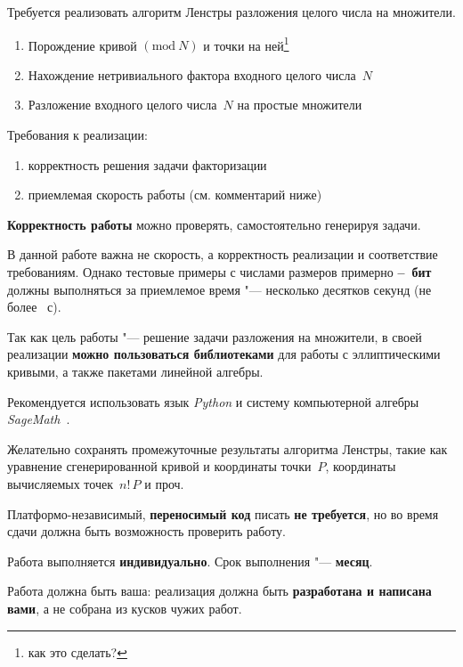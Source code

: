 \documentclass{ca-capstone}
\begin{document}


\goal
Требуется реализовать алгоритм Ленстры разложения целого числа на множители.

\functionality
\begin{enumerate}
  \item Порождение кривой $(\mathrm{mod}\ N)$ и точки на ней\footnote{как это сделать?}
  \item Нахождение нетривиального фактора входного целого числа~$N$
  \item Разложение входного целого числа~$N$ на простые множители
\end{enumerate}

\requirements
Требования к реализации:
\begin{enumerate}
  \item корректность решения задачи факторизации
  \item приемлемая скорость работы (см. комментарий ниже)
\end{enumerate}

\textbf{Корректность работы} можно проверять, самостоятельно генерируя задачи.

В данной работе важна не скорость, а корректность реализации и соответствие требованиям.
Однако тестовые примеры с числами размеров примерно \textbf{\ReqBitsMin--\ReqBitsMax~бит}
должны выполняться за приемлемое время "--- несколько десятков секунд (не более
\ReqSeconds~с).

\details
Так как цель работы "--- решение задачи разложения на множители, в своей реализации
\textbf{можно пользоваться библиотеками} для работы с эллиптическими кривыми, а также пакетами
линейной алгебры.

Рекомендуется использовать язык \emph{Python} и систему компьютерной алгебры
\emph{SageMath}~\cite{sagemath}.

Желательно сохранять промежуточные результаты алгоритма Ленстры, такие как уравнение
сгенерированной кривой и координаты точки~$P$, координаты вычисляемых точек~$n!\,P$ и проч.

Платформо-независимый, \textbf{переносимый код} писать \textbf{не требуется}, но во время сдачи
должна быть возможность проверить работу.

\schedule
Работа выполняется \textbf{индивидуально}. Срок выполнения "--- \textbf{месяц}.

Работа должна быть ваша: реализация должна быть \textbf{разработана и написана вами}, а не
собрана из кусков чужих работ.
\end{document}
